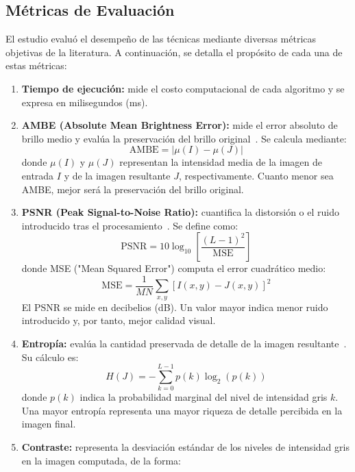 \documentclass[journal,10pt,twocolumn]{IEEEtran}
\begin{document}
\subsection{Métricas de Evaluación}
El estudio evaluó el desempeño de las técnicas mediante diversas métricas objetivas de la literatura. A continuación, se detalla el propósito de cada una de estas métricas:
\begin{enumerate}
	\item \textbf{Tiempo de ejecución:} mide el costo computacional de cada algoritmo y se expresa en milisegundos (ms).
	\item \textbf{AMBE (Absolute Mean Brightness Error):} mide el error absoluto de brillo medio y evalúa la preservación del brillo original~\cite{aquino2017bi}. Se calcula mediante:
	\begin{equation}
		\mathrm{AMBE} = \left|\mu(I)-\mu(J)\right|
	\end{equation}
	donde $\mu(I)$ y $\mu(J)$ representan la intensidad media de la imagen de entrada $I$ y de la imagen resultante $J$, respectivamente. Cuanto menor sea AMBE, mejor será la preservación del brillo original.
	\item \textbf{PSNR (Peak Signal-to-Noise Ratio):} cuantifica la distorsión o el ruido introducido tras el procesamiento~\cite{hore2010image}. Se define como:
	\begin{equation}
		\mathrm{PSNR} = 10\log_{10}\left[\frac{(L-1)^2}{\mathrm{MSE}}\right]
	\end{equation}
	donde MSE ("Mean Squared Error") computa el error cuadrático medio:
	\begin{equation}
		\mathrm{MSE} = \frac{1}{MN}\sum_{x,y}\left[I(x,y)-J(x,y)\right]^2
	\end{equation}
	El PSNR se mide en decibelios (dB). Un valor mayor indica menor ruido introducido y, por tanto, mejor calidad visual.
	\item \textbf{Entropía:} evalúa la cantidad preservada de detalle de la imagen resultante~\cite{aquino2017bi}. Su cálculo es:
	\begin{equation}
		H(J)=-\sum_{k=0}^{L-1} p(k)\log_2\left(p(k)\right)
	\end{equation}
	donde $p(k)$ indica la probabilidad marginal del nivel de intensidad gris $k$. Una mayor entropía representa una mayor riqueza de detalle percibida en la imagen final.
	\item \textbf{Contraste:} representa la desviación estándar de los niveles de intensidad gris en la imagen computada, de la forma:

\end{enumerate}
\end{document}
